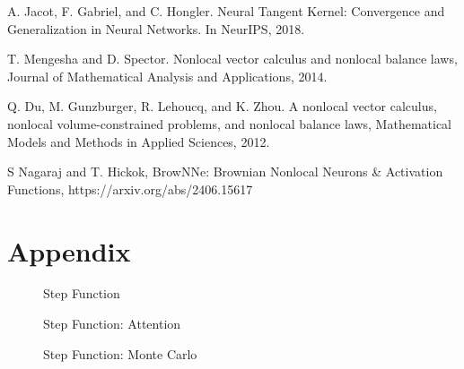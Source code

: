 \documentclass[11pt]{article}
\theoremstyle{plain}
\begin{document}

\begin{thebibliography}{9}
A. Jacot, F. Gabriel, and C. Hongler. Neural Tangent Kernel: Convergence and Generalization in Neural Networks. In NeurIPS, 2018.

T. Mengesha and D. Spector. Nonlocal vector calculus and nonlocal balance laws, Journal of Mathematical Analysis and Applications, 2014.

Q. Du, M. Gunzburger, R. Lehoucq, and K. Zhou. A nonlocal vector calculus, nonlocal volume-constrained problems, and nonlocal balance laws, Mathematical Models and Methods in Applied Sciences, 2012.

S Nagaraj and T. Hickok, BrowNNe: Brownian Nonlocal Neurons \& Activation Functions, https://arxiv.org/abs/2406.15617
\end{thebibliography}

\section{Appendix}

\begin{figure}%
    \centering
    \qquad
    \caption{Step Function}%
    \label{fig:example}%
\end{figure}
\begin{figure}%
    \centering
    \qquad
    \caption{Step Function: Attention}%
    \label{fig:example}%
\end{figure}
\begin{figure}%
    \centering
    \qquad
    \caption{Step Function: Monte Carlo}%
    \label{fig:example}%
\end{figure}
\end{document}
